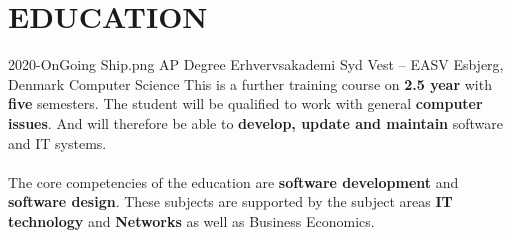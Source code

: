 \section*{{\faGraduationCap} EDUCATION}
\MySection
    {2020-OnGoing}
    {Ship.png}
    {AP Degree}
    {Erhvervsakademi Syd Vest -- EASV}
    {Esbjerg, Denmark}
    {Computer Science}
    {
        This is a further training course on \textbf{2.5 year} with \textbf{five} semesters.
        The student will be qualified to work with general \textbf{computer issues}.
        And will therefore be able to \textbf{develop, update and maintain} software and IT systems.\\
        \\
        The core competencies of the education are \textbf{software development} and \textbf{software design}.
        These subjects are supported by the subject areas \textbf{IT technology} and \textbf{Networks}
        as well as Business Economics.\\
    }
\vspace*{0.22cm}
